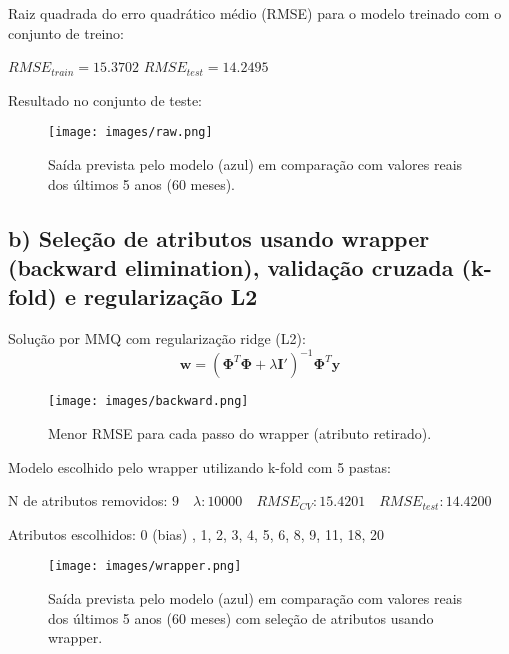 \documentclass[a4paper, 12pt]{article}
\begin{document}
Raiz quadrada do erro quadrático médio (RMSE) para o modelo treinado com o conjunto de treino:

$ RMSE _{train} = 15.3702$
\hspace{2em}
$ RMSE _{test} = 14.2495$

Resultado no conjunto de teste:

\begin{figure}[h!]
    \centering
    \texttt{[image: images/raw.png]}
    \caption{Saída prevista pelo modelo (azul) em comparação com valores reais dos últimos 5 anos (60 meses).}
\end{figure}

\subsection*{b) Seleção de atributos usando wrapper (backward elimination), validação cruzada (k-fold) e regularização L2}

Solução por MMQ com regularização ridge (L2):
\begin{equation}
    \mathbf{w} = (\boldsymbol{\Phi}^T\boldsymbol{\Phi} + \lambda\mathbf{I'})^{-1}\boldsymbol{\Phi}^T\mathbf{y}
\end{equation}

\begin{figure}[h!]
    \centering
    \texttt{[image: images/backward.png]}
    \caption{Menor RMSE para cada passo do wrapper (atributo retirado).}
\end{figure}

Modelo escolhido pelo wrapper utilizando k-fold com 5 pastas:

N de atributos removidos: $9 \quad \lambda: 10000 \quad RMSE_{CV}: 15.4201 \quad RMSE_{test}: 14.4200$

Atributos escolhidos: 0 (bias) , 1, 2, 3, 4, 5, 6, 8, 9, 11, 18, 20

\begin{figure}[h!]
    \centering
    \texttt{[image: images/wrapper.png]}
    \caption{Saída prevista pelo modelo (azul) em comparação com valores reais dos últimos 5 anos (60 meses) com seleção de atributos usando wrapper.}
\end{figure}
\end{document}
